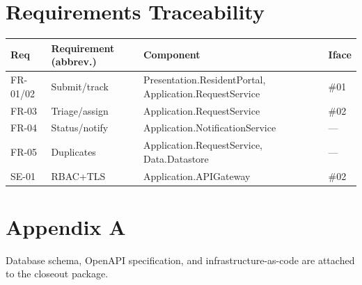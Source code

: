 \documentclass[11pt,letterpaper]{article}
\begin{document}
\section{Requirements Traceability}
\begin{table}[H]\begin{center}\begin{tabular}{ | p{1.6cm} | p{5cm} | p{3.4cm} | p{1.6cm} |}\hline
\textbf{Req} & \textbf{Requirement (abbrev.)} & \textbf{Component} & \textbf{Iface} \\ \hline
FR-01/02 & Submit/track & Presentation.ResidentPortal, Application.RequestService & \#01 \\ \hline
FR-03 & Triage/assign & Application.RequestService & \#02 \\ \hline
FR-04 & Status/notify & Application.NotificationService & --- \\ \hline
FR-05 & Duplicates & Application.RequestService, Data.Datastore & --- \\ \hline
SE-01 & RBAC+TLS & Application.APIGateway & \#02 \\ \hline
\end{tabular}\end{center}\end{table}

\section{Appendix A}
Database schema, OpenAPI specification, and infrastructure-as-code are attached to
the closeout package.


{}
\end{document}
